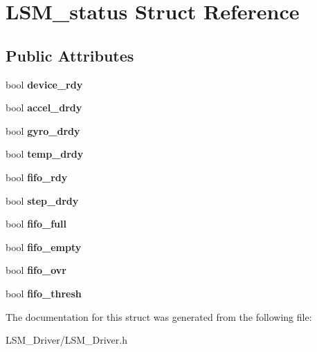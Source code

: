 \hypertarget{structLSM__status}{}\section{L\+S\+M\+\_\+status Struct Reference}
\label{structLSM__status}
\subsection*{Public Attributes}
\begin{DoxyCompactItemize}
\item 
\mbox{\label{structLSM__status_ad625d0b1e5a64038e235047b52a5cb04}} 
bool {\bfseries device\+\_\+rdy}
\item 
\mbox{\label{structLSM__status_a87163366812a238903332a99ce0cb27f}} 
bool {\bfseries accel\+\_\+drdy}
\item 
\mbox{\label{structLSM__status_a7178acde664eb3e8c8f88878277dcf2f}} 
bool {\bfseries gyro\+\_\+drdy}
\item 
\mbox{\label{structLSM__status_a19bff2b3e7ab5e6234c373325ee84bad}} 
bool {\bfseries temp\+\_\+drdy}
\item 
\mbox{\label{structLSM__status_adc8916440d8ce5de552d571ca53f2748}} 
bool {\bfseries fifo\+\_\+rdy}
\item 
\mbox{\label{structLSM__status_a1baec138f3c771116fa1bd5366c1148d}} 
bool {\bfseries step\+\_\+drdy}
\item 
\mbox{\label{structLSM__status_a1b478b805466228e8134b1b9753cdfe4}} 
bool {\bfseries fifo\+\_\+full}
\item 
\mbox{\label{structLSM__status_a1038a7382ad777148076467030f5c5d2}} 
bool {\bfseries fifo\+\_\+empty}
\item 
\mbox{\label{structLSM__status_ae60fcf3017c4811d437e5f95ad435b57}} 
bool {\bfseries fifo\+\_\+ovr}
\item 
\mbox{\label{structLSM__status_a44701e6d51fa9ec895f928431e0ae9dc}} 
bool {\bfseries fifo\+\_\+thresh}
\end{DoxyCompactItemize}


The documentation for this struct was generated from the following file\+:\begin{DoxyCompactItemize}
\item 
L\+S\+M\+\_\+\+Driver/L\+S\+M\+\_\+\+Driver.\+h\end{DoxyCompactItemize}

